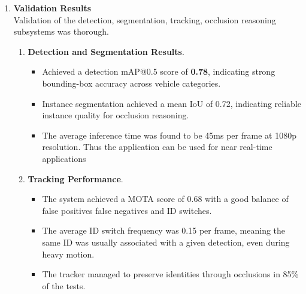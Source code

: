 \documentclass[12pt,a4paper]{report}
\theoremstyle{definition}
\theoremstyle{remark}
\begin{document}
\begin{enumerate}
\begin{itemize}
\item \textbf{Hardware:}.
The tested system was an NVIDIA RTX 3090 for accelerated inference of deep learning projects, AMD Ryzen 9 5950X for multithreading, and 64GB RAM for video files and intermediate layer outputs.

\item \textbf{Software Stack:}.
The pipeline was implemented in Python 3.8, with deep learning powered by PyTorch 1.12.1 and GPU drivers by CUDA 11.6.
They also incorporated additional libraries like OpenCV, NumPy, and SciPy, which helped video handling and other mathematical operations.

\item \textbf{Datasets:}.
We evaluated on some benchmark datasets (BDD100K, Waymo Open Dataset) and a real-world traffic footage we collected from intersections and dashcams.
This ensured that the system was tested under occlusion and light of all kinds.
\end{itemize}

    \item \textbf{Validation Results}\\
    Validation of the detection, segmentation, tracking, occlusion reasoning subsystems was thorough.

\begin{enumerate}

\item \textbf{Detection and Segmentation Results}.
\begin{itemize}
\item Achieved a detection mAP@0.5 score of \textbf{0.78}, indicating strong bounding-box accuracy across vehicle categories.
\item Instance segmentation achieved a mean IoU of 0.72, indicating reliable instance quality for occlusion reasoning.
\item The average inference time was found to be 45ms per frame at 1080p resolution. Thus the application can be used for near real-time applications
\end{itemize}

\item \textbf{Tracking Performance}.
\begin{itemize}
\item The system achieved a MOTA score of 0.68 with a good balance of false positives false negatives and ID switches.
\item The average ID switch frequency was 0.15 per frame, meaning the same ID was usually associated with a given detection, even during heavy motion. 
\item The tracker managed to preserve identities through occlusions in 85\% of the tests.
\end{itemize}


\end{enumerate}
\end{enumerate}
\end{document}
